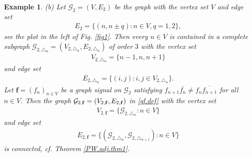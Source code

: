 \documentclass[12pt,oneside,reqno]{amsart}
\newtheorem{example}[theorem]{Example}%
\numberwithin{equation}{section}
\begin{document}
\begin{example}
{		\medskip	
			(b)   Let $\mathcal{G}_2=(V,E_2)$ be the graph  with the vertex set $V$ and edge set
			\begin{align*}
				E_2=\{(n,n\pm q): n\in V, q=1,2 \}, 
			\end{align*}
			see the  plot in the left of  Fig. \ref{fig1}.  Then every $n\in V$ is contained in a complete subgraph $\mathcal{G}_{2,\triangle_n} = (V_{2,\triangle_n}, E_{2,\triangle_n})$ of order $3$ with the vertex set
			\begin{align*}
				V_{2,\triangle_n} = \{n-1, n, n+1 \}
			\end{align*}
			and edge set
			\begin{align*}
				E_{2,\triangle_n} = \{(i,j): i,j \in V_{2,\triangle_n}\}.
			\end{align*}
			Let $\mathbf{f}=(f_n)_{n\in V}$ be a graph signal on ${\mathcal G}_2$ satisfying $ f_{n+1}\overline{f_n}\ne f_{n}\overline{f_{n+1}}$ for all $n\in V$. Then  the graph ${\mathcal G}_{2,\bf f} = (V_{2,\mathbf{f}}, E_{2,\mathbf{f}})$ in \eqref{gf.def} with  the vertex set 
			\begin{align*}
				V_{2,\mathbf{f}} = \{\mathcal{G}_{2,\triangle_n}: n\in V \}
			\end{align*}
			and edge set
			\begin{align*}
				E_{2,\mathbf{f}} = \{(\mathcal{G}_{2,\triangle_n}, \mathcal{G}_{2,\triangle_{n+1}}): n\in V \}
			\end{align*}
			is connected, cf. Theorem \ref{PW.adj.thm1}. %
			
			\begin{figure}[t]
				\centering
				\begin{minipage}{0.47\textwidth}
					\centering
\end{minipage}
\end{figure}}
\end{example}
\end{document}
